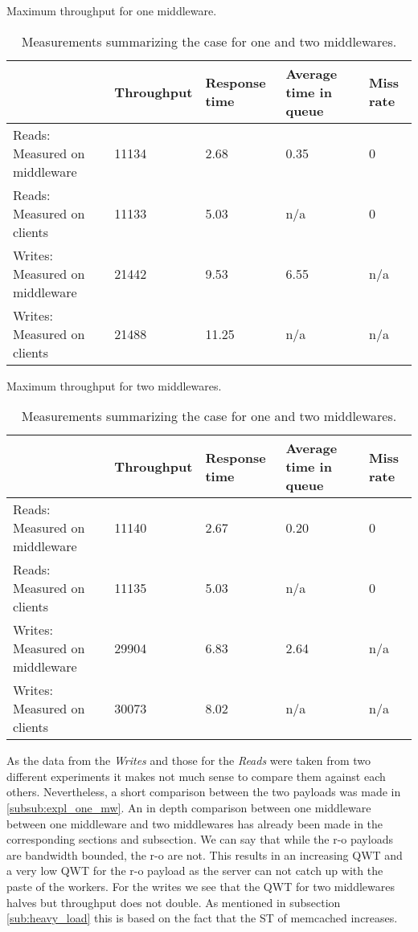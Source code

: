 \documentclass[11pt,a4paper]{article}
\let\ti\textit
\begin{document}
\begin{table}
\begin{center}
	{Maximum throughput for one middleware.}
	\begin{tabular}{|l|p{2cm}|p{2cm}|p{2cm}|p{2cm}|}
		\hline                                & Throughput & Response time & Average time in queue & Miss rate \\ 
		\hline Reads: Measured on middleware  &     11134  &   2.68        &       0.35            &    0       \\ 
		\hline Reads: Measured on clients     &     11133  &   5.03        & n/a                   &     0      \\ 
		\hline Writes: Measured on middleware &     21442  &   9.53        &       6.55            & n/a       \\ 
		\hline Writes: Measured on clients    &     21488  &   11.25       & n/a                   & n/a       \\ 
		\hline 
	\end{tabular}
\end{center}

\begin{center} 
	{Maximum throughput for two middlewares.}
	\begin{tabular}{|l|p{2cm}|p{2cm}|p{2cm}|p{2cm}|}
		\hline                                & Throughput & Response time & Average time in queue & Miss rate \\ 
		\hline Reads: Measured on middleware  &   11140    &     2.67      &         0.20          &    0       \\ 
		\hline Reads: Measured on clients     &    11135   &     5.03      & n/a                   &    0      \\ 
		\hline Writes: Measured on middleware &   29904    &     6.83      &         2.64          & n/a       \\ 
		\hline Writes: Measured on clients    &   30073    &     8.02      & n/a                   & n/a       \\ 
		\hline 
	\end{tabular}
\end{center}
    \caption{Measurements summarizing the case for one and two middlewares.}
    \label{tbl:baseline_with_mw:measurements}
\end{table}
As the data from the \ti{Writes} and those for the \ti{Reads} were taken from two different experiments it makes not much sense to compare them against each others. Nevertheless, a short comparison between the two payloads was made in \ref{subsub:expl_one_mw}. An in depth comparison between one middleware between one middleware and two middlewares has already been made in the corresponding sections and subsection. We can say that while the r-o payloads are bandwidth bounded, the r-o are not. This results in an increasing QWT and a very low QWT for the r-o payload as the server can not catch up with the paste of the workers. For the writes we see that the QWT for two middlewares halves but throughput does not double. As mentioned in subsection \ref{sub:heavy_load} this is based on the fact that the ST of memcached increases. 
\end{document}

